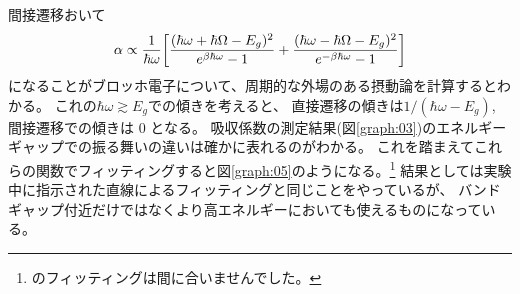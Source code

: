 \documentclass[11pt,dvipdfmx,a4paper]{jsarticle}
\begin{document}
間接遷移おいて
\begin{align}
    \alpha \propto \frac{1}{\hbar\omega}\qty[
        \frac{(\hbar\omega+\hbar\Omega -E_g)^2}{e^{\beta\hbar\omega}-1}
        + \frac{(\hbar\omega-\hbar\Omega -E_g)^2}{e^{-\beta\hbar\omega}-1}
    ]
\end{align}
になることがブロッホ電子について、周期的な外場のある摂動論を計算するとわかる\cite{mikoshiba}。
これの\(\hbar\omega \gtrsim E_g\)での傾きを考えると、
直接遷移の傾きは\(1/(\hbar\omega-E_g)\),
間接遷移での傾きは 0 となる。
吸収係数の測定結果(図\ref{graph:03})のエネルギーギャップでの振る舞いの違いは確かに表れるのがわかる。
これを踏まえてこれらの関数でフィッティングすると図\ref{graph:05}のようになる。\footnote{のフィッティングは間に合いませんでした。}
結果としては実験中に指示された直線によるフィッティングと同じことをやっているが、
バンドギャップ付近だけではなくより高エネルギーにおいても使えるものになっている。
\end{document}

